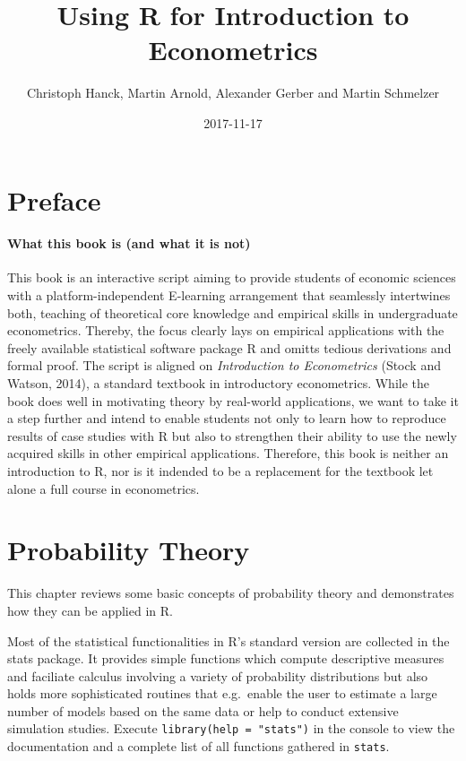 \documentclass[]{book}
\title{Using R for Introduction to Econometrics}
\author{Christoph Hanck, Martin Arnold, Alexander Gerber and Martin Schmelzer}
\date{2017-11-17}
\theoremstyle{definition}
\theoremstyle{definition}
\theoremstyle{definition}
\theoremstyle{remark}
\begin{document}
\maketitle

{
\setcounter{tocdepth}{1}
\tableofcontents
}
\chapter{Preface}\label{preface}

\subsubsection*{What this book is (and what it is
not)}\label{what-this-book-is-and-what-it-is-not}

This book is an interactive script aiming to provide students of
economic sciences with a platform-independent E-learning arrangement
that seamlessly intertwines both, teaching of theoretical core knowledge
and empirical skills in undergraduate econometrics. Thereby, the focus
clearly lays on empirical applications with the freely available
statistical software package R and omitts tedious derivations and formal
proof. The script is aligned on \emph{Introduction to Econometrics}
(Stock and Watson, 2014), a standard textbook in introductory
econometrics. While the book does well in motivating theory by
real-world applications, we want to take it a step further and intend to
enable students not only to learn how to reproduce results of case
studies with R but also to strengthen their ability to use the newly
acquired skills in other empirical applications. Therefore, this book is
neither an introduction to R, nor is it indended to be a replacement for
the textbook let alone a full course in econometrics.

\chapter{Probability Theory}\label{probability-theory}

This chapter reviews some basic concepts of probability theory and
demonstrates how they can be applied in R.

Most of the statistical functionalities in R's standard version are
collected in the stats package. It provides simple functions which
compute descriptive measures and faciliate calculus involving a variety
of probability distributions but also holds more sophisticated routines
that e.g.~enable the user to estimate a large number of models based on
the same data or help to conduct extensive simulation studies. Execute
\texttt{library(help\ =\ "stats")} in the console to view the
documentation and a complete list of all functions gathered in
\texttt{stats}.
\end{document}
